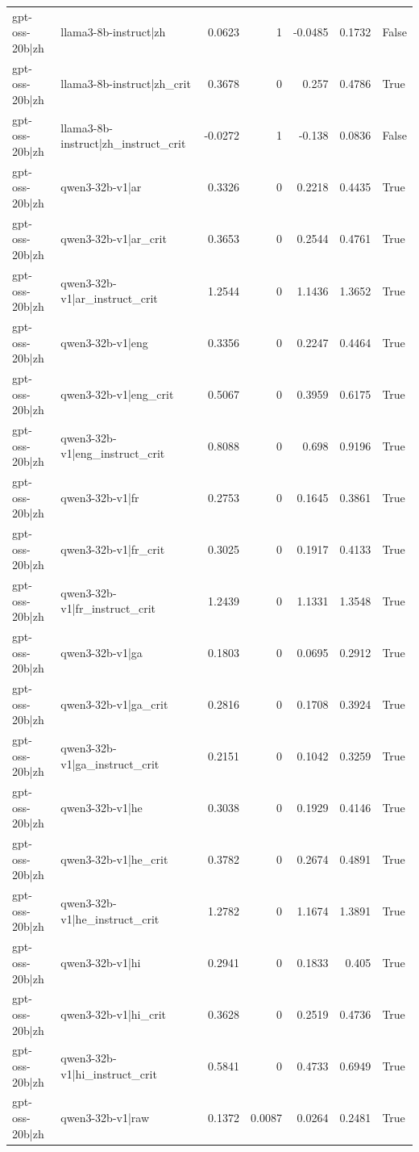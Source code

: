 \begin{table}
\begin{tabular}{l l r r r r l}
gpt-oss-20b|zh & llama3-8b-instruct|zh & 0.0623 & 1 & -0.0485 & 0.1732 & False \\
gpt-oss-20b|zh & llama3-8b-instruct|zh_crit & 0.3678 & 0 & 0.257 & 0.4786 & True \\
gpt-oss-20b|zh & llama3-8b-instruct|zh_instruct_crit & -0.0272 & 1 & -0.138 & 0.0836 & False \\
gpt-oss-20b|zh & qwen3-32b-v1|ar & 0.3326 & 0 & 0.2218 & 0.4435 & True \\
gpt-oss-20b|zh & qwen3-32b-v1|ar_crit & 0.3653 & 0 & 0.2544 & 0.4761 & True \\
gpt-oss-20b|zh & qwen3-32b-v1|ar_instruct_crit & 1.2544 & 0 & 1.1436 & 1.3652 & True \\
gpt-oss-20b|zh & qwen3-32b-v1|eng & 0.3356 & 0 & 0.2247 & 0.4464 & True \\
gpt-oss-20b|zh & qwen3-32b-v1|eng_crit & 0.5067 & 0 & 0.3959 & 0.6175 & True \\
gpt-oss-20b|zh & qwen3-32b-v1|eng_instruct_crit & 0.8088 & 0 & 0.698 & 0.9196 & True \\
gpt-oss-20b|zh & qwen3-32b-v1|fr & 0.2753 & 0 & 0.1645 & 0.3861 & True \\
gpt-oss-20b|zh & qwen3-32b-v1|fr_crit & 0.3025 & 0 & 0.1917 & 0.4133 & True \\
gpt-oss-20b|zh & qwen3-32b-v1|fr_instruct_crit & 1.2439 & 0 & 1.1331 & 1.3548 & True \\
gpt-oss-20b|zh & qwen3-32b-v1|ga & 0.1803 & 0 & 0.0695 & 0.2912 & True \\
gpt-oss-20b|zh & qwen3-32b-v1|ga_crit & 0.2816 & 0 & 0.1708 & 0.3924 & True \\
gpt-oss-20b|zh & qwen3-32b-v1|ga_instruct_crit & 0.2151 & 0 & 0.1042 & 0.3259 & True \\
gpt-oss-20b|zh & qwen3-32b-v1|he & 0.3038 & 0 & 0.1929 & 0.4146 & True \\
gpt-oss-20b|zh & qwen3-32b-v1|he_crit & 0.3782 & 0 & 0.2674 & 0.4891 & True \\
gpt-oss-20b|zh & qwen3-32b-v1|he_instruct_crit & 1.2782 & 0 & 1.1674 & 1.3891 & True \\
gpt-oss-20b|zh & qwen3-32b-v1|hi & 0.2941 & 0 & 0.1833 & 0.405 & True \\
gpt-oss-20b|zh & qwen3-32b-v1|hi_crit & 0.3628 & 0 & 0.2519 & 0.4736 & True \\
gpt-oss-20b|zh & qwen3-32b-v1|hi_instruct_crit & 0.5841 & 0 & 0.4733 & 0.6949 & True \\
gpt-oss-20b|zh & qwen3-32b-v1|raw & 0.1372 & 0.0087 & 0.0264 & 0.2481 & True \\

\end{tabular}
\end{table}
